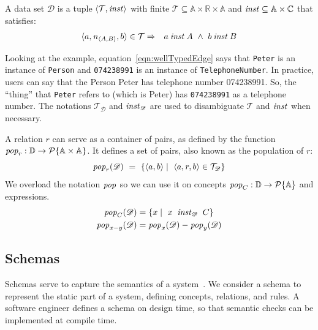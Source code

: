 \documentclass[runningheads]{llncs}
\newcommand{\id}[1]{\text{\it #1\/}}
\newcommand{\popF}[1]{\id{pop}_{#1}}
\newcommand{\pop}[2]{\popF{#1}(#2)}
\newcommand{\instance}{\mathbin{\id{inst}}}
\newcommand{\powerset}[1]{\cal{P}\{#1\}}
\newcommand{\declare}[3]{\id{#1}_{\pair{#2}{#3}}}
\newcommand{\pair}[2]{\langle{#1},{#2}\rangle}
\newcommand{\Pair}[2]{#1\times#2}
\newcommand{\triple}[3]{\langle{#1},{#2},{#3}\rangle}
\newcommand{\atom}[1]{{\tt\small #1}}
\newcommand{\Atoms}{\mathbb{A}}
\newcommand{\Concepts}{\mathbb{C}}
\newcommand{\Rels}{\mathbb{R}}   %
\newcommand{\triples}{\mathcal{T}}
\newcommand{\Triple}[3]{#1\times#2\times#3}
\newcommand{\dataset}{\mathscr{D}}
\newcommand{\Dataset}{\mathbb{D}}
\begin{document}
   \begin{definition}
   A data set $\dataset$ is a tuple $\pair{\triples}{\instance}$ with finite $\triples \subseteq {\Triple{\Atoms}{\Rels}{\Atoms}}$ and $\instance \subseteq  {\Pair{\Atoms}{\Concepts}}$ that satisfies:
\begin{eqnarray}
   \triple{a}{\declare{n}{A}{B}}{b}\in\triples&\Rightarrow&a\instance A\ \wedge\ b\instance B
   \label{eqn:wellTypedEdge}
\end{eqnarray}
\end{definition}
   Looking at the example,
   equation~\ref{eqn:wellTypedEdge} says that \atom{Peter} is an instance of {\tt Person} and \atom{074238991} is an instance of {\tt TelephoneNumber}.
   In practice, users can say that the Person Peter has telephone number 074238991.
   So, the ``thing'' that \atom{Peter} refers to (which is Peter) has \atom{074238991} as a telephone number.
   The notations $\triples_{\dataset}$ and $\instance_{\dataset}$ are used to disambiguate $\triples$ and $\instance$ when necessary.

   A relation $r$ can serve as a container of pairs,
   as defined by the function $\popF{r}:\Dataset\rightarrow\powerset{\Pair{\Atoms}{\Atoms}}$.
   It defines a set of pairs, also known as the population of $r$:
\begin{equation}
   \pop{r}{\dataset}\ =\ \{ \pair{a}{b}\mid\ \triple{a}{r}{b}\in\triples_{\dataset}\}
\label{eqn:pop-rel}
\end{equation}
%
   We overload the notation $\popF{}$ so we can use it on concepts $\popF{C}:\Dataset\rightarrow\powerset{\Atoms}$
   and expressions.
\begin{align}
   \pop{C}{\dataset}&= \{ x\mid\ x\ \instance_{\dataset}\ C\}
\label{eqn:pop-concept}\\
   \pop{x-y}{\dataset}&= \pop{x}{\dataset} - \pop{y}{\dataset}
\label{eqn:pop-expr}
\end{align}

\subsection{Schemas}
\label{sct:Schemas}
   Schemas serve to capture the semantics of a system~\cite{Spivak2012}.
   We consider a schema to represent the static part of a system, defining concepts, relations, and rules.
   A software engineer defines a schema on design time, so that semantic checks can be implemented at compile time.
\end{document}
